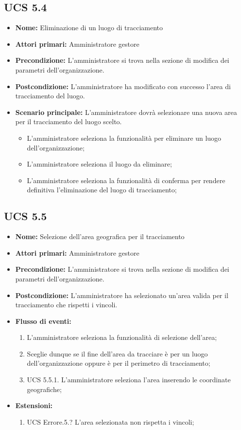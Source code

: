 \subsection{UCS 5.4}%
\begin{itemize}
    \item \textbf{Nome:} Eliminazione di un luogo di tracciamento
    \item \textbf{Attori primari:} Amministratore gestore
    \item \textbf{Precondizione:} L'amministratore si trova nella sezione di modifica dei parametri dell'organizzazione.
    \item \textbf{Postcondizione:} L'amministratore ha modificato con successo l'area di tracciamento del luogo.
    \item \textbf{Scenario principale:} L'amministratore dovrà selezionare una nuova area per il tracciamento del luogo scelto.
    \begin{itemize}%
        \item L'amministratore seleziona la funzionalità per eliminare un luogo dell'organizzazione;
        \item L'amministratore seleziona il luogo da eliminare;
        \item L'amministratore seleziona la funzionalità di conferma per rendere definitiva l'eliminazione del luogo di tracciamento;
    \end{itemize}
\end{itemize}

\subsection{UCS 5.5}%
\begin{itemize}
\item \textbf{Nome:} Selezione dell'area geografica per il tracciamento
\item \textbf{Attori primari:} Amministratore gestore
\item \textbf{Precondizione:} L'amministratore si trova nella sezione di modifica dei parametri dell'organizzazione.
\item \textbf{Postcondizione:} L'amministratore ha selezionato un'area valida per il tracciamento che rispetti i vincoli.
\item \textbf{Flusso di eventi:}
\begin{enumerate}
    \item L'amministratore seleziona la funzionalità di selezione dell'area;
    \item Sceglie dunque se il fine dell'area da tracciare è per un luogo dell'organizzazione oppure è per il perimetro di tracciamento;
    \item UCS 5.5.1. L'amministratore seleziona l'area inserendo le coordinate geografiche;
\end{enumerate}
\item \textbf{Estensioni:}
\begin{enumerate}
    \item UCS Errore.5.? L'area selezionata non rispetta i vincoli;
\end{enumerate}
\end{itemize}

